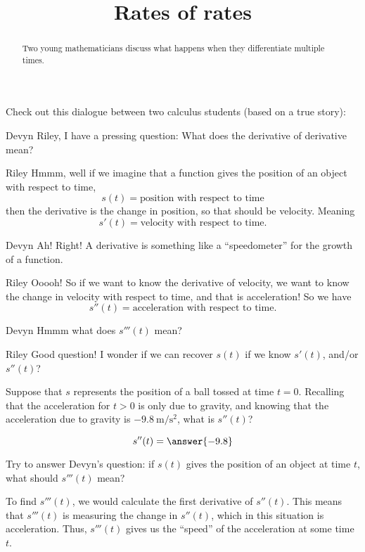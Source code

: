 \documentclass{ximera}
\title[Break-Ground:]{Rates of rates}
\begin{document}
\begin{abstract}
Two young mathematicians discuss what happens when they differentiate
multiple times.
\end{abstract}
\maketitle

Check out this dialogue between two calculus students (based on a true
story):

\begin{dialogue}
  \item[Devyn] Riley, I have a pressing question: What does the
    derivative of derivative mean?
  \item[Riley] Hmmm, well if we imagine that a function gives the
    position of an object with respect to time,
    \[
    s(t) = \text{position with respect to time}
    \]
    then the derivative is the change in position, so that should be
    velocity. Meaning
    \[
    s'(t) = \text{velocity with respect to time}.
    \]
  \item[Devyn] Ah! Right! A derivative is something like a
    ``speedometer'' for the growth of a function.
  \item[Riley] Ooooh! So if we want to know the derivative of
    velocity, we want to know the change in velocity with respect to
    time, and that is acceleration! So we have
    \[
    s''(t) = \text{acceleration with respect to time}.
    \]
  \item[Devyn] Hmmm what does $s'''(t)$ mean?
    \item[Riley] Good question! I wonder if we can recover $s(t)$ if
      we know $s'(t)$, and/or $s''(t)$?
\end{dialogue}

\begin{problem}
  Suppose that $s$ represents the position of a ball tossed at time
  $t=0$. Recalling that the acceleration for $t>0$ is only due to
  gravity, and knowing that the acceleration due to gravity is
  $-9.8~\mathrm{m}/\mathrm{s}^2$, what is $s''(t)$?
  \begin{prompt}
  \[
  s''(t) = \answer{-9.8}
  \]
  \end{prompt}
\end{problem}


\begin{problem}
	Try to answer Devyn's question: if $s(t)$ gives 
	the position of an object at time $t$, what should $s'''(t)$ mean?
	
	\begin{freeResponse}
		To find $s'''(t)$, we would calculate the first derivative of $s''(t)$.
		This means that $s'''(t)$ is measuring the change in $s''(t)$, which
		in this situation is acceleration.  Thus, $s'''(t)$ gives us the ``speed''
		of the acceleration at some time $t$.
	\end{freeResponse}
\end{problem}



\end{document}
